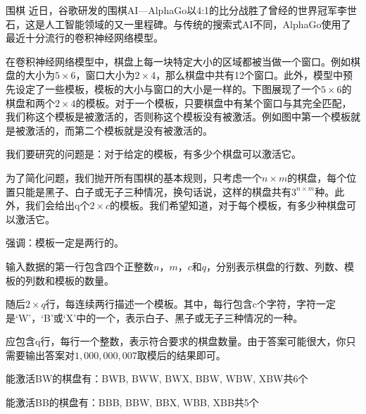 \begin{problem}{围棋}
近日，谷歌研发的围棋AI—AlphaGo以4:1的比分战胜了曾经的世界冠军李世石，这是人工智能领域的又一里程碑。与传统的搜索式AI不同，AlphaGo使用了最近十分流行的卷积神经网络模型。

在卷积神经网络模型中，棋盘上每一块特定大小的区域都被当做一个窗口。例如棋盘的大小为$5\times 6$，窗口大小为$2\times 4$，那么棋盘中共有12个窗口。此外，模型中预先设定了一些模板，模板的大小与窗口的大小是一样的。下图展现了一个$5\times 6$的棋盘和两个$2\times 4$的模板。对于一个模板，只要棋盘中有某个窗口与其完全匹配，我们称这个模板是被激活的，否则称这个模板没有被激活。例如图中第一个模板就是被激活的，而第二个模板就是没有被激活的。

\begin{figure}[h!]
\centering
{}
\end{figure}

我们要研究的问题是：对于给定的模板，有多少个棋盘可以激活它。  

为了简化问题，我们抛开所有围棋的基本规则，只考虑一个$n\times m$的棋盘，每个位置只能是黑子、白子或无子三种情况，换句话说，这样的棋盘共有$3^{n\times m}$种。此外，我们会给出q个$2\times c$的模板。我们希望知道，对于每个模板，有多少种棋盘可以激活它。

强调：模板一定是两行的。

  
\InputFile
输入数据的第一行包含四个正整数$n$，$m$，$c$和$q$，分别表示棋盘的行数、列数、模板的列数和模板的数量。

随后$2\times q$行，每连续两行描述一个模板。其中，每行包含c个字符，字符一定是‘W’，‘B’或‘X’中的一个，表示白子、黑子或无子三种情况的一种。

\OutputFile
应包含q行，每行一个整数，表示符合要求的棋盘数量。由于答案可能很大，你只需要输出答案对$1,000,000,007$取模后的结果即可。

\Example
\begin{example}
\end{example}

\Hint
能激活BW的棋盘有：BWB, BWW, BWX, BBW, WBW, XBW共6个

能激活BB的棋盘有：BBB, BBW, BBX, WBB, XBB共5个


\end{problem}
